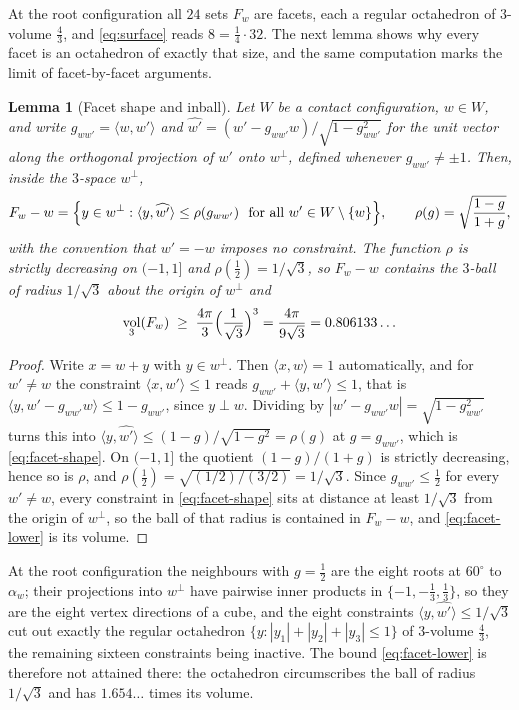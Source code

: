 \documentclass[11pt,reqno]{amsart}
\renewcommand{\_}{\origunderscore\allowbreak}
\numberwithin{equation}{section}
\theoremstyle{plain}
\newtheorem{lem}[thm]{Lemma}
\theoremstyle{definition}
\theoremstyle{remark}
\DeclareMathOperator{\vol}{vol}
\begin{document}
At the root configuration all $24$ sets $F_w$ are facets, each a regular
octahedron of $3$-volume $\tfrac43$, and \eqref{eq:surface} reads
$8=\tfrac14\cdot32$. The next lemma shows why every facet is an
octahedron of exactly that size, and the same computation marks the limit
of facet-by-facet arguments.

\begin{lem}[Facet shape and inball]\label{lem:facet-inball}
Let $W$ be a contact configuration, $w\in W$, and write
$g_{w w'}=\langle w,w'\rangle$ and
$\widehat{w'}=(w'-g_{ww'}w)/\sqrt{1-g_{ww'}^2}$ for the unit vector
along the orthogonal projection of $w'$ onto $w^{\perp}$, defined
whenever $g_{ww'}\ne\pm1$. Then, inside the $3$-space $w^{\perp}$,
\begin{equation}\label{eq:facet-shape}
  F_w-w=\Bigl\{y\in w^{\perp}:\langle y,\widehat{w'}\rangle
  \le\rho(g_{ww'})\ \text{ for all }w'\in W\setminus\{w\}\Bigr\},
  \qquad
  \rho(g)=\sqrt{\frac{1-g}{1+g}},
\end{equation}
with the convention that $w'=-w$ imposes no constraint. The function
$\rho$ is strictly decreasing on $(-1,1]$ and $\rho(\tfrac12)=1/\sqrt3$,
so $F_w-w$ contains the $3$-ball of radius $1/\sqrt3$ about the origin
of $w^{\perp}$ and
\begin{equation}\label{eq:facet-lower}
  \vol_3(F_w)\;\ge\;\frac{4\pi}{3}\Bigl(\frac{1}{\sqrt3}\Bigr)^{3}
  =\frac{4\pi}{9\sqrt3}=0.806133\ldots
\end{equation}
\end{lem}

\begin{proof}
Write $x=w+y$ with $y\in w^{\perp}$. Then $\langle x,w\rangle=1$
automatically, and for $w'\ne w$ the constraint $\langle
x,w'\rangle\le1$ reads $g_{ww'}+\langle y,w'\rangle\le1$, that is
$\langle y,w'-g_{ww'}w\rangle\le1-g_{ww'}$, since $y\perp w$. Dividing
by $|w'-g_{ww'}w|=\sqrt{1-g_{ww'}^2}$ turns this into
$\langle y,\widehat{w'}\rangle\le(1-g)/\sqrt{1-g^{2}}=\rho(g)$ at
$g=g_{ww'}$, which is \eqref{eq:facet-shape}. On $(-1,1]$ the quotient
$(1-g)/(1+g)$ is strictly decreasing, hence so is $\rho$, and
$\rho(\tfrac12)=\sqrt{(1/2)/(3/2)}=1/\sqrt3$. Since $g_{ww'}\le\tfrac12$
for every $w'\ne w$, every constraint in \eqref{eq:facet-shape} sits at
distance at least $1/\sqrt3$ from the origin of $w^{\perp}$, so the ball
of that radius is contained in $F_w-w$, and \eqref{eq:facet-lower} is
its volume.
\end{proof}

At the root configuration the neighbours with $g=\tfrac12$ are the eight
roots at $60^{\circ}$ to $\alpha_w$; their projections into $w^{\perp}$
have pairwise inner products in $\{-1,-\tfrac13,\tfrac13\}$, so they are
the eight vertex directions of a cube, and the eight constraints
$\langle y,\widehat{w'}\rangle\le1/\sqrt3$ cut out exactly the regular
octahedron $\{y:|y_1|+|y_2|+|y_3|\le1\}$ of $3$-volume $\tfrac43$, the
remaining sixteen constraints being inactive. The bound
\eqref{eq:facet-lower} is therefore not attained there: the octahedron
circumscribes the ball of radius $1/\sqrt3$ and has $1.654\ldots$ times
its volume.
\end{document}
